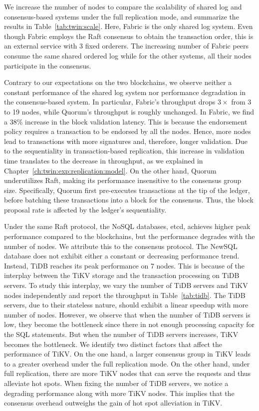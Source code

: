 We increase the number of nodes to compare the scalability of shared log and
consensus-based systems under the full replication mode, and summarize the
results in Table~\ref{tab:twin:scale}.
Here, Fabric is the only shared log system.
Even though Fabric employs the Raft consensus to obtain the transaction order,
this is an external service with 3 fixed orderers. 
The increasing number of Fabric peers consume the same shared ordered log while for the other systems, all their nodes participate in the consensus.

Contrary to our expectations on the two blockchains, we observe neither a constant performance of the
shared log system nor performance degradation in the consensus-based system.
In particular, Fabric's throughput drops $3\times$ from 3 to 19 nodes, while
Quorum's throughput is roughly unchanged.
In Fabric, we find a $38\%$ increase in the block validation latency.
This is because the endorsement policy requires a transaction to be endorsed by
all the nodes.
Hence, more nodes lead to transactions with more signatures and, therefore,
longer validation.
Due to the sequentiality in transaction-based replication, this increase in
validation time translates to the decrease in throughput, as we explained in
Chapter~\ref{ch:twin:exp:replication:model}.
On the other hand, Quorum underutilizes Raft, making its performance insensitive
to the consensus group size.
Specifically, Quorum first pre-executes transactions at the tip of the ledger,
before batching these transactions into a block for the consensus.
Thus, the block proposal rate is affected by the ledger's sequentiality.

Under the same Raft protocol, the NoSQL databases, etcd, achieves
higher peak performance compared to the blockchains, but the performance
degrades with the number of nodes.
We attribute this to the consensus protocol.
The NewSQL database does not exhibit either a constant or decreasing performance
trend.
Instead, TiDB reaches its peak performance on 7 nodes.
This is because of the interplay between the TiKV storage and the
transaction processing on TiDB servers.
To study this interplay, we vary the number of TiDB servers and TiKV nodes independently and report the throughput in Table~\ref{tab:tidb}.
The TiDB servers, due to their stateless nature, should exhibit a linear speedup with more number of nodes. 
However, we observe that when the number of TiDB servers is low, they become the bottleneck since there in not enough processing capacity for the SQL statements. 
But when the number of TiDB servers increases, TiKV becomes the bottleneck.
We identify two distinct factors that affect the performance of TiKV.
On the one hand, a larger consensus group in TiKV leads to a greater overhead under the full replication mode. 
On the other hand, under full replication, there are more TiKV nodes that can serve the requests and thus alleviate hot spots.
When fixing the number of TiDB servers, we notice a degrading performance along with more TiKV nodes.
This implies that the consensus overhead outweighs the gain of hot spot alleviation in TiKV.

